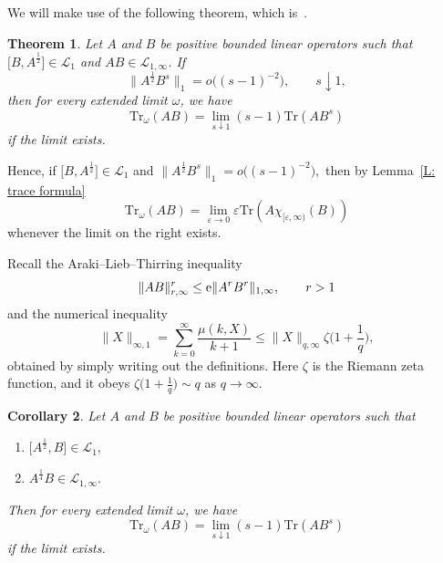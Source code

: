 \documentclass[pdftex]{sigma}
\numberwithin{equation}{section}
\newtheorem{Theorem}{Theorem}[section]
\newtheorem{Corollary}[Theorem]{Corollary}
\begin{document}
We will make use of the following theorem, which is~\cite[Theorem~1.3.20]{LMSZVol2}.
\begin{Theorem}\label{LSZ2ethm}
 Let $A$ and $B$ be positive bounded linear operators such that $\big[B,A^{\frac12}\big] \in \mathcal{L}_1$ and $AB\in \mathcal{L}_{1,\infty}$. If
 \[
 \big\|A^{\frac12}B^s\big\|_1 = o\big((s-1)^{-2}\big),\qquad s\downarrow 1,
 \]
 then for every extended limit $\omega$, we have
 \[
 \mathrm{Tr}_{\omega}(AB) = \lim_{s\downarrow 1} (s-1)\mathrm{Tr}(AB^s)
 \]
 if the limit exists.
\end{Theorem}
Hence, if $\big[B,A^{\frac12}\big] \in \mathcal{L}_1$ and $\big\|A^{\frac12}B^s\big\|_1 = o\big((s-1)^{-2}\big),$ then by Lemma~\ref{L: trace formula}
\[
 \mathrm{Tr}_{\omega}(AB) = \lim_{\varepsilon\to 0} \varepsilon\mathrm{Tr}(A\chi_{[\varepsilon,\infty)}(B))
\]
whenever the limit on the right exists.


Recall the Araki--Lieb--Thirring inequality~\cite{Kosaki1992}
\begin{equation}\label{alt_inequality}
 \|AB\|_{r,\infty}^r \leq {\rm e}\|A^rB^r\|_{1,\infty},\qquad r > 1
\end{equation}
and the numerical inequality
\begin{equation}\label{zeta_inequality}
 \|X\|_{\infty,1} = \sum_{k=0}^\infty \frac{\mu(k,X)}{k+1} \leq \|X\|_{q,\infty}\zeta\bigg(1+\frac1q\bigg),
\end{equation}
obtained by simply writing out the definitions. Here $\zeta$ is the Riemann zeta function, and it obeys $\zeta\big(1+\frac1q\big) \sim q$ as $q\to\infty.$

\begin{Corollary}%
 Let $A$ and $B$ be positive bounded linear operators such that
 \begin{enumerate}\itemsep=0pt
 \item[$(i)$] $\big[A^{\frac12},B\big] \in \mathcal{L}_1,$ %
 \item[$(ii)$] $A^{\frac14}B \in \mathcal{L}_{1,\infty}.$ %
 \end{enumerate}
 Then for every extended limit $\omega$, we have
 \[
 \mathrm{Tr}_{\omega}(AB) = \lim_{s\downarrow 1} (s-1)\mathrm{Tr}(AB^s)
 \]
 if the limit exists.
\end{Corollary}
\end{document}
